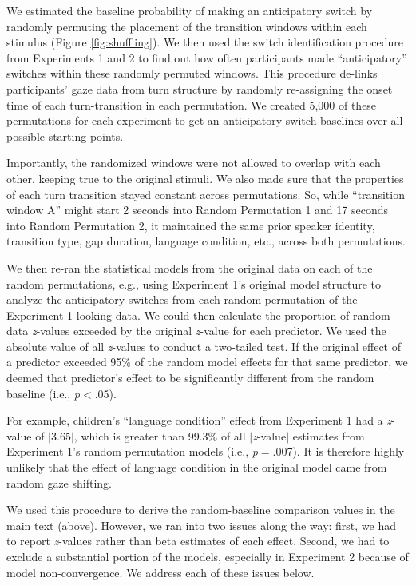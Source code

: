 \documentclass[authoryear, 12pt]{elsarticle}
\begin{document}
We estimated the baseline probability of making an anticipatory switch by randomly permuting the placement of the transition windows within each stimulus (Figure \ref{fig:shuffling}). We then used the switch identification procedure from Experiments 1 and 2 to find out how often participants made ``anticipatory'' switches within these randomly permuted windows. This procedure de-links participants' gaze data from turn structure by randomly re-assigning the onset time of each turn-transition in each permutation. We created 5,000 of these permutations for each experiment to get an anticipatory switch baselines over all possible starting points.

Importantly, the randomized windows were not allowed to overlap with each other, keeping true to the original stimuli. We also made sure that the properties of each turn transition stayed constant across permutations. So, while ``transition window A'' might start 2 seconds into Random Permutation 1 and 17 seconds into Random Permutation 2, it maintained the same prior speaker identity, transition type, gap duration, language condition, etc., across both permutations.

We then re-ran the statistical models from the original data on each of the random permutations, e.g., using Experiment 1's original model structure to analyze the anticipatory switches from each random permutation of the Experiment 1 looking data. We could then calculate the proportion of random data \textit{z}-values exceeded by the original \textit{z}-value for each predictor. We used the absolute value of all \textit{z}-values to conduct a two-tailed test. If the original effect of a predictor exceeded 95\% of the random model effects for that same predictor, we deemed that predictor's effect to be significantly different from the random baseline (i.e., \textit{p}$<$.05).

For example, children's ``language condition'' effect from Experiment 1 had a \textit{z}-value of $|$3.65$|$, which is greater than 99.3\% of all $|$\textit{z}-value$|$ estimates from Experiment 1's random permutation models (i.e., \textit{p}$=$.007). It is therefore highly unlikely that the effect of language condition in the original model came from random gaze shifting.

We used this procedure to derive the random-baseline comparison values in the main text (above). However, we ran into two issues along the way: first, we had to report \textit{z}-values rather than beta estimates of each effect. Second, we had to exclude a substantial portion of the models, especially in Experiment 2 because of model non-convergence. We address each of these issues below.
\end{document}
